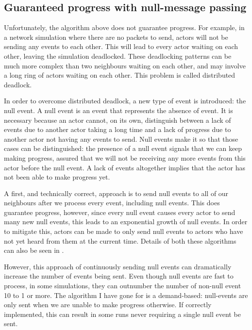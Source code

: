 \subsection{Guaranteed progress with null-message passing} \label{null-messages}

Unfortunately, the algorithm above does not guarantee progress.
For example, in a network simulation where there are no packets to send, actors will not be sending any events to each other.
This will lead to every actor waiting on each other, leaving the simulation deadlocked.
These deadlocking patterns can be much more complex than two neighbours waiting on each other, and may involve a long ring of actors waiting on each other.
This problem is called distributed deadlock.

In order to overcome distributed deadlock, a new type of event is introduced: the null event.
A null event is an event that represents the absence of event.
It is necessary because an actor cannot, on its own, distinguish between a lack of events due to another actor taking a long time and a lack of progress due to another actor not having any events to send.
Null events make it so that those cases can be distinguished: the presence of a null event signals that we can keep making progress, assured that we will not be receiving any more events from this actor before the null event.
A lack of events altogether implies that the actor has not been able to make progress yet.

A first, and technically correct, approach is to send null events to all of our neighbours after we process every event, including null events.
This does guarantee progress, however, since every null event causes every actor to send many new null events, this leads to an exponential growth of null events.
In order to mitigate this, actors can be made to only send null events to actors who have not yet heard from them at the current time.
Details of both these algorithms can also be seen in \cite{misra_distributed_1986}.

However, this approach of continuously sending null events can dramatically increase the number of events being sent.
Even though null events are fast to process, in some simulations, they can outnumber the number of non-null event 10 to 1 or more.
The algorithm I have gone for is a demand-based: null-events are only sent when we are unable to make progress otherwise.
If correctly implemented, this can result in some runs never requiring a single null event be sent.

